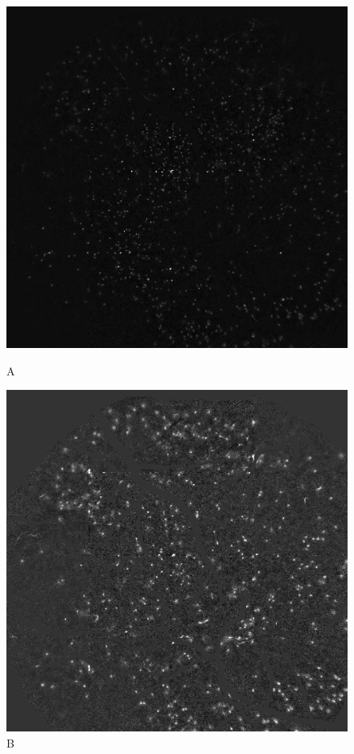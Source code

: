 \documentclass[10pt]{article}
\begin{document}
\begin{figure}[h]
    \centering

    \begin{minipage}{0.49\textwidth}
      \centering
      \includegraphics[width=\textwidth]{figs/composite_A.png}
      \caption*{A}
    \end{minipage}
    \begin{minipage}{0.49\textwidth}
      \centering
      \includegraphics[width=\textwidth]{figs/composite_B.png}
      \caption*{B}
    \end{minipage}


\end{figure}
\end{document}
